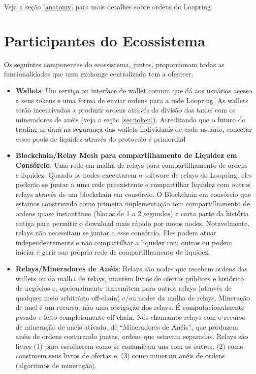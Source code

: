 \documentclass[UTF8,nofonts]{article}
\begin{document}
\begin{multicols}{2}
Veja a seção \ref{anatomy} para mais detalhes sobre ordens do Loopring.

\section{Participantes do Ecossistema\label{sec:ecosystem}}
Os seguintes componentes do ecossistema, juntos, proporcionam todas as funcionalidades que uma exchange centralizada tem a oferecer.

\begin{itemize}
	\item \textbf{Wallets}: Um serviço ou interface de wallet comum que dá aos usuários acesso a seus tokens e uma forma de enviar ordens para a rede Loopring. As wallets serão incentivadas a produzir ordens através da divisão das taxas com os mineradores de anéis (veja a seção \ref{sec:token}). Acreditando que o futuro do trading se dará na segurança das wallets individuais de cada usuário, conectar esses pools de liquidez através do protocolo é primordial
	\item \textbf{Blockchain/Relay Mesh para compartilhamento de Liquidez em Consórcio}: Uma rede em malha de relays para compartilhamento de ordens e liquidez. Quando os nodes executarem o software de relays do Loopring, eles poderão se juntar a uma rede preexistente e compartilhar liquidez com outros relays através de um blockchain em consórcio. O Blockchain em consórcio que estamos construindo como primeira implementação tem compartilhamento de ordens quase instantâneo (blocos de 1 a 2 segundos) e corta parte da história antiga para permitir o download mais rápido por novos nodes. Notavelmente, relays não necessitam se juntar a esse consórcio. Eles podem atuar independentemente e não compartilhar a liquidez com outros ou podem iniciar e gerir sua própria rede de compartilhamento de liquidez.
	\item \textbf{Relays/Mineradores de Anéis}: Relays são nodes que recebem ordens das wallets ou da malha de relays, mantêm livros de ofertas públicos e histórico de negócios e, opcionalmente transmitem para outros relays (através de qualquer meio arbitrário off-chain) e/ou nodes da malha de relays. Mineração de anel é um recurso, não uma obrigação dos relays. É computacionalmente pesado e feito completamente off-chain. Nós chamamos relays com o recurso de mineração de anéis ativado, de \enquote{Mineradores de Anéis}, que produzem anéis de ordens costurando juntas, ordens que estavam separadas. Relays são livres (1) para escolherem como se comunicam uns com os outros, (2) como constroem seus livros de ofertas e, (3) como mineram anéis de ordens (algoritmos de mineração).

\end{itemize}
\end{multicols}
\end{document}
